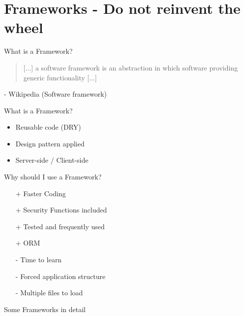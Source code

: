 \section{Frameworks - Do not reinvent the wheel}
\begin{frame}{What is a Framework?}
	\begin{quote}
		[...] a software framework is an abstraction in which software providing generic functionality [...]
	\end{quote}
	- Wikipedia (Software framework)
\end{frame}

\begin{frame}{What is a Framework?}
	\begin{itemize}
		\item Reusable code (DRY)
		\item Design pattern applied
		\item Server-side / Client-side %
	\end{itemize}
\end{frame}

\begin{frame}{Why should I use a Framework?}
	\begin{itemize}
		\item[+] Faster Coding
		\item[+] Security Functions included
		\item[+] Tested and frequently used
		\item[+] ORM
	\end{itemize}
	\begin{itemize}
		\item[-] Time to learn
		\item[-] Forced application structure
		\item[-] Multiple files to load
	\end{itemize}
\end{frame}

\begin{frame}{Some Frameworks in detail}
\end{frame}


